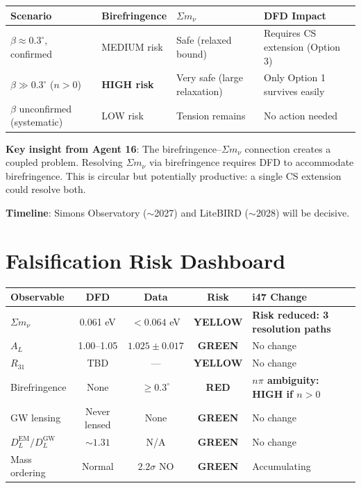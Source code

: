 \documentclass[11pt,a4paper]{article}
\newcommand{\GREEN}{\textcolor{dfdgreen}{\textbf{GREEN}}}
\newcommand{\YELLOW}{\textcolor{dfdyellow}{\textbf{YELLOW}}}
\newcommand{\RED}{\textcolor{dfdred}{\textbf{RED}}}
\begin{document}
\begin{center}
\begin{tabular}{lp{3cm}p{3cm}p{3cm}}
\toprule
\textbf{Scenario} & \textbf{Birefringence} & \textbf{$\Sigma m_\nu$} & \textbf{DFD Impact} \\
\midrule
$\beta \approx 0.3^\circ$, confirmed & MEDIUM risk & Safe (relaxed bound) & Requires CS extension (Option 3) \\
$\beta \gg 0.3^\circ$ ($n > 0$) & \textbf{HIGH risk} & Very safe (large relaxation) & Only Option 1 survives easily \\
$\beta$ unconfirmed (systematic) & LOW risk & Tension remains & No action needed \\
\bottomrule
\end{tabular}
\end{center}

\textbf{Key insight from Agent 16}: The birefringence--$\Sigma m_\nu$ connection creates a coupled problem. Resolving $\Sigma m_\nu$ via birefringence requires DFD to accommodate birefringence. This is circular but potentially productive: a single CS extension could resolve both.

\textbf{Timeline}: Simons Observatory ($\sim$2027) and LiteBIRD ($\sim$2028) will be decisive.


\part{Falsification Risk Dashboard}

\begin{center}
\begin{tabular}{lcccl}
\toprule
\textbf{Observable} & \textbf{DFD} & \textbf{Data} & \textbf{Risk} & \textbf{i47 Change} \\
\midrule
$\Sigma m_\nu$ & 0.061 eV & $< 0.064$ eV & \YELLOW & \textbf{Risk reduced: 3 resolution paths} \\
$A_L$ & 1.00--1.05 & $1.025 \pm 0.017$ & \GREEN & No change \\
$R_{31}$ & TBD & --- & \YELLOW & No change \\
Birefringence & None & $\geq 0.3^\circ$ & \RED & \textbf{$n\pi$ ambiguity: HIGH if $n > 0$} \\
GW lensing & Never lensed & None & \GREEN & No change \\
$D_L^{\text{EM}}/D_L^{\text{GW}}$ & $\sim 1.31$ & N/A & \GREEN & No change \\
Mass ordering & Normal & $2.2\sigma$ NO & \GREEN & Accumulating \\
\bottomrule
\end{tabular}
\end{center}
\end{document}
